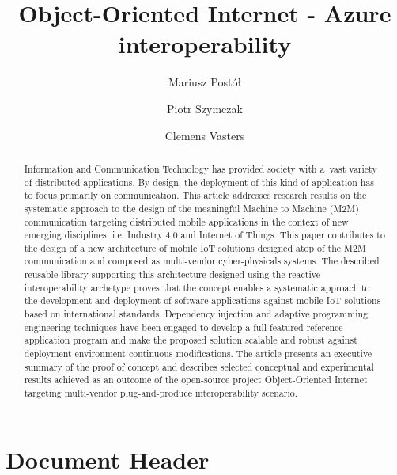 \documentclass{article}
\title{Object-Oriented Internet - Azure interoperability}
\author[1]{Mariusz Postół}
\author[2]{Piotr Szymczak}
\author[3]{Clemens Vasters}
\affil[1, 2]{Institute of Information Technology, Lodz University of Technology, Łódź, Poland}
\affil[3]{Microsort}
\begin{document}
 

\maketitle


\begin{abstract}

  Information and Communication Technology has provided society with a~vast variety of distributed applications. By design, the deployment of this kind of application has to focus primarily on communication. This article addresses research results on the systematic approach to the design of the meaningful Machine to Machine (M2M) communication targeting distributed mobile applications in the context of new emerging disciplines, i.e. Industry 4.0 and Internet of Things. This paper contributes to the design of a new architecture of mobile IoT solutions designed atop of the M2M communication and composed as multi-vendor cyber-physicals systems. The described reusable library supporting this architecture designed using the reactive interoperability archetype proves that the concept enables a systematic approach to the development and deployment of software applications against mobile IoT solutions based on international standards. Dependency injection and adaptive programming engineering techniques have been engaged to develop a full-featured reference application program and make the proposed solution scalable and robust against deployment environment continuous modifications. The article presents an executive summary of the proof of concept and describes selected conceptual and experimental results achieved as an outcome of the open-source project Object-Oriented Internet targeting multi-vendor plug-and-produce interoperability scenario.


\end{abstract}

\maketitle

\hypertarget{document-header}{%
  \section{Document Header}\label{document-header}}
\end{document}
